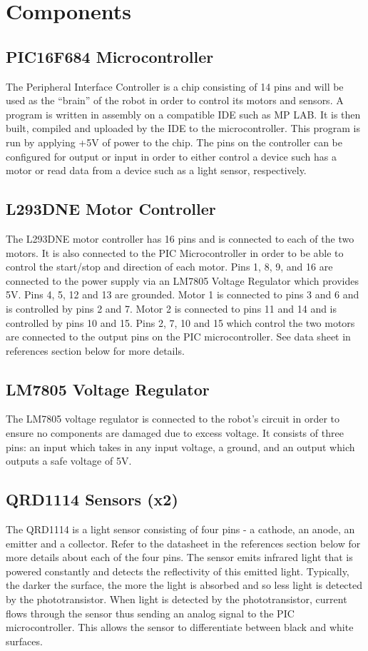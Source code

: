 \documentclass[12pt]{article}
\begin{document}
\section{Components}
\subsection{PIC16F684 Microcontroller}
The Peripheral Interface Controller is a chip consisting of 14 pins and will be used as the “brain” of the robot in order to control its motors and sensors. A program is written in assembly on a compatible IDE such as MP LAB. It is then built, compiled and uploaded by the IDE to the microcontroller. This program is run by applying +5V of power to the chip. The pins on the controller can be configured for output or input in order to either control a device such has a motor or read data from a device such as a light sensor, respectively.

\subsection{L293DNE Motor Controller}
The L293DNE motor controller has 16 pins and is connected to each of the two motors. It is also connected to the PIC Microcontroller in order to be able to control the start/stop and direction of each motor. Pins 1, 8, 9, and 16 are connected to the power supply via an LM7805 Voltage Regulator which provides 5V. Pins 4, 5, 12 and 13 are grounded. Motor 1 is connected to pins 3 and 6 and is controlled by pins 2 and 7. Motor 2 is connected to pins 11 and 14 and is controlled by pins 10 and 15. Pins 2, 7, 10 and 15 which control the two motors are connected to the output pins on the PIC microcontroller. See data sheet in references section below for more details.

\subsection{LM7805 Voltage Regulator}
The LM7805 voltage regulator is connected to the robot’s circuit in order to ensure no components are damaged due to excess voltage. It consists of three pins: an input which takes in any input voltage, a ground, and an output which outputs a safe voltage of 5V.

\subsection{QRD1114 Sensors (x2)}
The QRD1114 is a light sensor consisting of four pins - a cathode, an anode, an emitter and a collector. Refer to the datasheet in the references section below for more details about each of the four pins. The sensor emits infrared light that is powered constantly and detects the reflectivity of this emitted light. Typically, the darker the surface, the more the light is absorbed and so less light is detected by the phototransistor. When light is detected by the phototransistor, current flows through the sensor thus sending an analog signal to the PIC microcontroller. This allows the sensor to differentiate between black and white surfaces.
\end{document}
